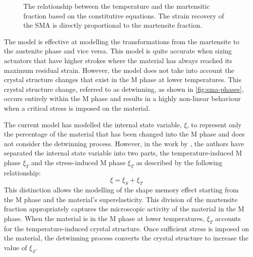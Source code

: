 \begin{figure}[hbt]
    \centering
    \resizebox{0.75\textwidth}{!}{}
    \caption{The relationship between the temperature and the martensitic fraction based on the \cite{brinsonOneDimensionalConstitutiveBehavior1993} constitutive equations. The strain recovery of the SMA is directly proportional to the martensite fraction.}
    \label{fig:sma-temperature-transformation-model}
\end{figure}

The \cite{liangConstitutiveModelingShape1990a} model is effective at modelling the transformations from the martensite to the austenite phase and vice versa. This model is quite accurate when sizing actuators that have higher strokes where the material has always reached its maximum residual strain. However, the model does not take into account the crystal structure changes that exist in the M phase at lower temperatures. This crystal structure change, referred to as detwinning, as shown in \cref{fig:sma-phases}, occurs entirely within the M phase and results in a highly non-linear behaviour when a critical stress is imposed on the material.

The current model has modelled the internal state variable, $\xi$, to represent only the percentage of the material that has been changed into the M phase and does not consider the detwinning process. However, in the work by \cite{brinsonOneDimensionalConstitutiveBehavior1993}, the authors have separated the internal state variable into two parts, the temperature-induced M phase $\xi_T$ and the stress-induced M phase $\xi_T$ as described by the following relationship:
\begin{equation}
  \label{eq:xis-xit}
  \xi = \xi_S + \xi_T
\end{equation}
This distinction allows the modelling of the shape memory effect starting from the M phase and the material's superelasticity. This division of the martensite fraction appropriately captures the microscopic activity of the material in the M phase. When the material is in the M phase at lower temperatures, $\xi_T$ accounts for the temperature-induced crystal structure. Once sufficient stress is imposed on the material, the detwinning process converts the crystal structure to increase the value of $\xi_S$.

